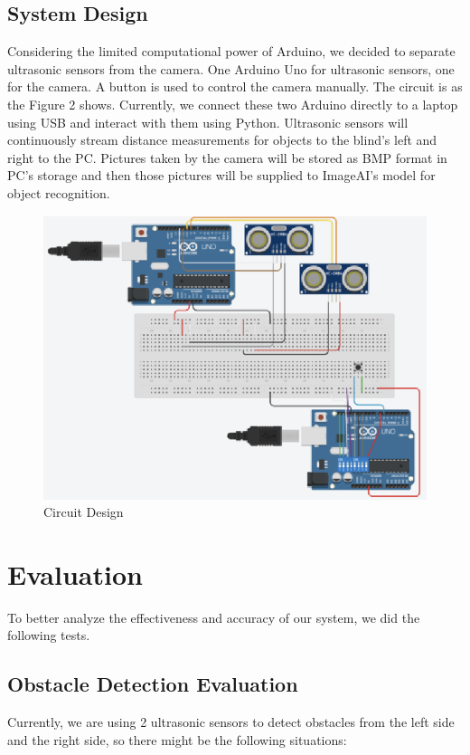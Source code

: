 \subsection{System Design}
Considering the limited computational power of Arduino, we decided to separate ultrasonic sensors from the camera. 
One Arduino Uno for ultrasonic sensors, one for the camera. A button is used to control the camera manually. 
The circuit is as the Figure 2 shows. Currently, we connect these two Arduino directly to a laptop using USB and interact with them using Python. 
\newline \newline
Ultrasonic sensors will continuously stream distance measurements for objects to the blind’s left and right to the PC. 
Pictures taken by the camera will be stored as BMP format in PC’s storage and then those pictures will be supplied to ImageAI’s model for object recognition. 

\begin{figure}
  \includegraphics{circuit}
  \caption{Circuit Design}
\end{figure}


\section{Evaluation}
To better analyze the effectiveness and accuracy of our system, we did the following tests.

\subsection{Obstacle Detection Evaluation}
Currently, we are using 2 ultrasonic sensors to detect obstacles from the left side and the right side, so there might be the following situations:

